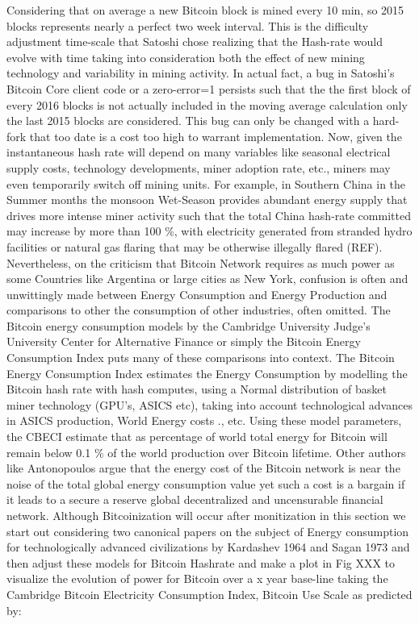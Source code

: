 \documentclass[final,5p,times,twocolumn,authoryear]{elsarticle}
\begin{document}
Considering that on average a new Bitcoin block is mined every 10 min, so 2015 blocks represents nearly a perfect two week interval. This is the difficulty adjustment time-scale that Satoshi chose realizing that the Hash-rate would evolve with time taking into consideration both the effect of new mining technology and variability in mining activity. In actual fact, a bug in Satoshi's Bitcoin Core client code or a zero-error=1 persists such that the the first block of every 2016 blocks is not actually included in the moving average calculation only the last 2015 blocks are considered. This bug can only be changed with a hard-fork that too date is a cost too high to warrant implementation. Now, given the instantaneous hash rate will depend on many variables like seasonal electrical supply costs, technology developments, miner adoption rate, etc., miners may even temporarily switch off mining units. For example, in Southern China in the Summer months the monsoon Wet-Season provides abundant energy supply that drives more intense miner activity such that the total China hash-rate committed may increase by more than 100 \%, with electricity generated from stranded hydro facilities or natural gas flaring that may be otherwise illegally flared (REF). Nevertheless, on the criticism that Bitcoin Network requires as much power as some Countries like Argentina or large cities as New York, confusion is often and unwittingly made between Energy Consumption and Energy Production and comparisons to other the consumption of other industries, often omitted. The Bitcoin energy consumption models by the Cambridge University Judge's University Center for Alternative Finance or simply the Bitcoin Energy Consumption Index puts many of these comparisons into context. The Bitcoin Energy Consumption Index estimates the Energy Consumption by modelling the Bitcoin hash rate with hash computes, using a Normal distribution of basket miner technology (GPU's, ASICS etc), taking into account technological advances in ASICS production, World Energy costs ., etc. Using these model parameters, the CBECI estimate that as percentage of world total energy for Bitcoin will remain below 0.1 \% of the world production over Bitcoin lifetime. Other authors like Antonopoulos argue that the energy cost of the Bitcoin network is near the noise of the total global energy consumption value yet such a cost is a bargain if it leads to a secure a reserve global decentralized and uncensurable financial network. Although Bitcoinization will occur after monitization in this section we start out considering two canonical papers on the subject of Energy consumption for technologically advanced civilizations by Kardashev 1964 and Sagan 1973 and then adjust these models for Bitcoin Hashrate and make a plot in Fig XXX to visualize the evolution of power for Bitcoin over a x year base-line taking the Cambridge Bitcoin Electricity Consumption Index, Bitcoin Use Scale as predicted by: \\
\end{document}
